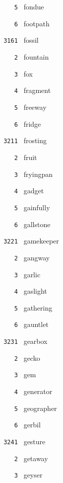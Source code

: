 \documentclass[11pt]{article}
\begin{document}
\begin{multicols}{6}
\noindent \texttt{ \ \ \ 5 } fondue  \par
\noindent \texttt{ \ \ \ 6 } footpath  \par
\vspace{3mm}
\noindent \texttt{ 3161 } fossil  \par
\noindent \texttt{ \ \ \ 2 } fountain  \par
\noindent \texttt{ \ \ \ 3 } fox  \par
\noindent \texttt{ \ \ \ 4 } fragment  \par
\noindent \texttt{ \ \ \ 5 } freeway  \par
\noindent \texttt{ \ \ \ 6 } fridge  \par
\noindent \texttt{ 3211 } frosting  \par
\noindent \texttt{ \ \ \ 2 } fruit  \par
\noindent \texttt{ \ \ \ 3 } fryingpan  \par
\noindent \texttt{ \ \ \ 4 } gadget  \par
\noindent \texttt{ \ \ \ 5 } gainfully  \par
\noindent \texttt{ \ \ \ 6 } gallstone  \par
\vspace{3mm}
\noindent \texttt{ 3221 } gamekeeper  \par
\noindent \texttt{ \ \ \ 2 } gangway  \par
\noindent \texttt{ \ \ \ 3 } garlic  \par
\noindent \texttt{ \ \ \ 4 } gaslight  \par
\noindent \texttt{ \ \ \ 5 } gathering  \par
\noindent \texttt{ \ \ \ 6 } gauntlet  \par
\vspace{3mm}
\noindent \texttt{ 3231 } gearbox  \par
\noindent \texttt{ \ \ \ 2 } gecko  \par
\noindent \texttt{ \ \ \ 3 } gem  \par
\noindent \texttt{ \ \ \ 4 } generator  \par
\noindent \texttt{ \ \ \ 5 } geographer  \par
\noindent \texttt{ \ \ \ 6 } gerbil  \par
\vspace{3mm}
\noindent \texttt{ 3241 } gesture  \par
\noindent \texttt{ \ \ \ 2 } getaway  \par
\noindent \texttt{ \ \ \ 3 } geyser  \par

\end{multicols}
\end{document}
